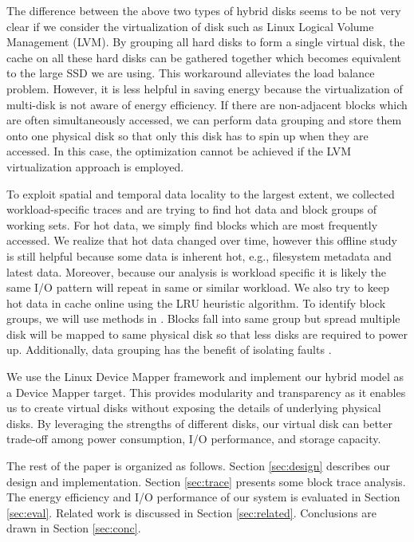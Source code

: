 The difference between the above two types of hybrid disks seems to be
not very clear if we consider the virtualization of disk such as Linux
Logical Volume Management (LVM). By grouping all hard disks to form a
single virtual disk, the cache on all these hard disks can be gathered
together which becomes equivalent to the large SSD we are using. This
workaround alleviates the load balance problem. However, it is less
helpful in saving energy because the virtualization of multi-disk is
not aware of energy efficiency. If there are non-adjacent blocks which
are often simultaneously accessed, we can perform data grouping and
store them onto one physical disk so that only this disk has to spin
up when they are accessed. In this case, the optimization cannot be
achieved if the LVM virtualization approach is employed. 

To exploit spatial and temporal data locality to the largest extent,
we collected workload-specific traces and are trying to find hot data
and block groups of working sets. For hot data, we simply find blocks
which are most frequently accessed. We realize that hot data changed
over time, however this offline study is still helpful because some
data is inherent hot, e.g., filesystem metadata and latest data.
Moreover, because our analysis is workload specific it is likely the
same I/O pattern will repeat in same or similar workload. We also try
to keep hot data in cache online using the LRU heuristic algorithm. To
identify block groups, we will use methods in \cite{Wildani_grouping}.
Blocks fall into same group but spread multiple disk will be mapped to
same physical disk so that less disks are required to power up.
Additionally, data grouping has the benefit of isolating faults
\cite{Sivathanu_dgraid, Wildani_grouping}. 

We use the Linux Device Mapper framework and implement our hybrid
model as a Device Mapper target. This provides modularity and
transparency as it enables us to create virtual disks without exposing
the details of underlying physical disks. By leveraging the strengths
of different disks, our virtual disk can better trade-off among power
consumption, I/O performance, and storage capacity.

The rest of the paper is organized as follows. Section
\ref{sec:design} describes our design and implementation. Section
\ref{sec:trace} presents some block trace analysis.  The energy
efficiency and I/O performance of our system is evaluated in Section
\ref{sec:eval}. Related work is discussed in Section
\ref{sec:related}. Conclusions are drawn in Section \ref{sec:conc}.

